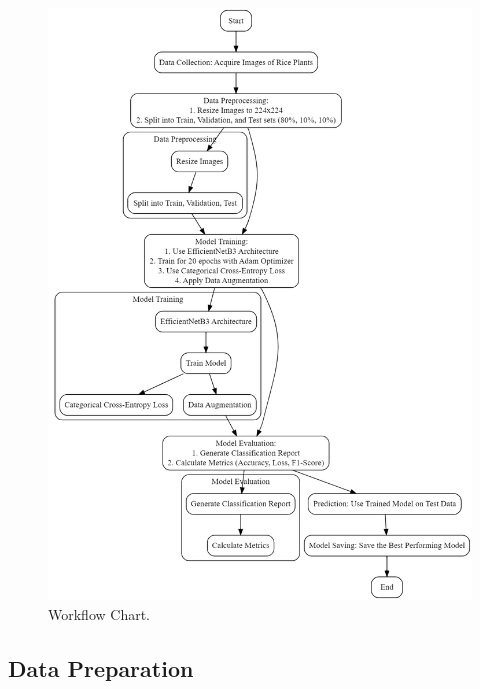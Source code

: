 \documentclass[conference]{IEEEtran}
\begin{document}
\begin{figure}[H]
    \centerline{\includegraphics[width=\linewidth]{fig1.png}}
    \caption{Workflow Chart.}
    \label{fig1}
\end{figure}

\subsection{Data Preparation}
\end{document}
